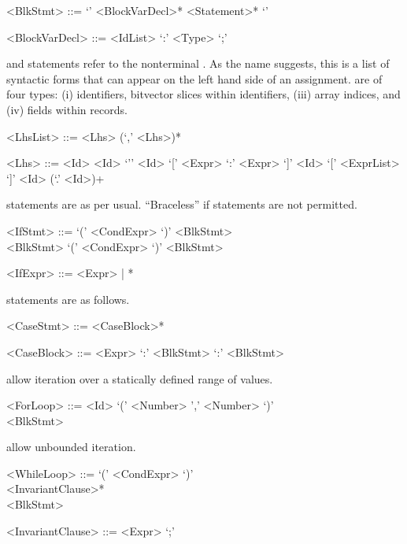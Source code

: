 \begin{grammar}
    <BlkStmt> ::= `{' <BlockVarDecl>* <Statement>* `}'

    <BlockVarDecl> ::=  <IdList> `:' <Type> `;'
\end{grammar}


 and  statements refer to the nonterminal . As the name suggests, this is a list of syntactic forms that can appear on the left hand side of an assignment.  are of four types: (i) identifiers, bitvector slices within identifiers, (iii) array indices, and (iv) fields within records.
\begin{grammar}
    <LhsList> ::= <Lhs> (`,' <Lhs>)*

    <Lhs> ::= <Id>
	  \alt <Id> `'' 
          \alt <Id> `[' <Expr> `:' <Expr> `]'
          \alt <Id> `[' <ExprList> `]'
          \alt <Id> (`.' <Id>)+
\end{grammar}

 statements are as per usual. ``Braceless'' if statements are not permitted.
\begin{grammar}
    <IfStmt> ::= 
     `(' <CondExpr> `)'  <BlkStmt> \\  <BlkStmt>
    \alt {} `(' <CondExpr> `)'  <BlkStmt>

    <IfExpr> ::= <Expr> | *
\end{grammar}

 statements are as follows.
\begin{grammar}
    <CaseStmt> ::=  <CaseBlock>* 

    <CaseBlock> ::= <Expr> `:' <BlkStmt>
                \alt {} `:' <BlkStmt>
\end{grammar}

 allow iteration over a statically defined range of values.
\begin{grammar}
    <ForLoop> ::=  <Id>   `(' <Number> ',' <Number> `)' \\
                  <BlkStmt>
\end{grammar}

 allow unbounded iteration.
\begin{grammar}
    <WhileLoop> ::=  `(' <CondExpr> `)' \\
                  <InvariantClause>* \\
                  <BlkStmt>

    <InvariantClause> ::=  <Expr> `;'
\end{grammar}

